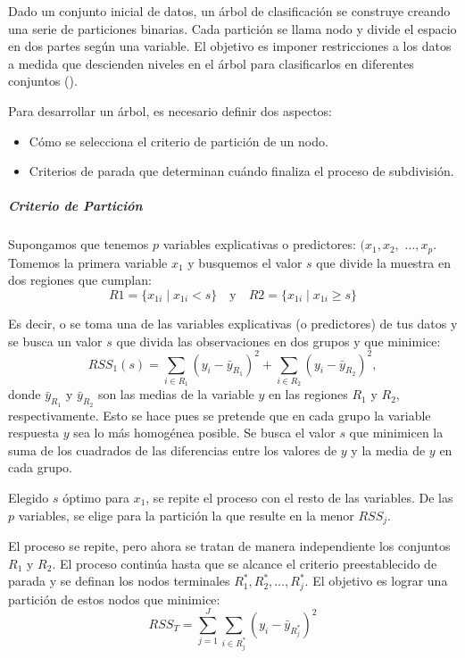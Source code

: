 {Dado un conjunto inicial de datos, un árbol de clasificación se construye creando una serie de particiones binarias. Cada partición se llama nodo y divide el espacio en dos partes según una variable. El objetivo es imponer restricciones a los datos a medida que descienden niveles en el árbol para clasificarlos en diferentes conjuntos (\cite{wu2008top}).

Para desarrollar un árbol, es necesario definir dos aspectos:
\begin{itemize}
	\item Cómo se selecciona el criterio de partición de un nodo.
	\item Criterios de parada que determinan cuándo finaliza el proceso de subdivisión.
\end{itemize}


\subparagraph{Criterio de Partición}
Supongamos que tenemos \(p\) variables explicativas o predictores: $(x_1, x_2,$ $\ldots, x_p$. Tomemos la primera variable \(x_1\) y busquemos el valor \(s\) que divide la muestra en dos regiones que cumplan:
\[
R1 = \{x_{1i} \mid x_{1i} < s\} \quad \text{y} \quad R2 = \{x_{1i} \mid x_{1i} \geq s\}
\]

Es decir, o se toma una de las variables explicativas (o predictores) de tus datos y se busca un valor $s$ que divida las observaciones en dos grupos y que minimice:
\[
RSS_1(s) = \sum_{i \in R_1} (y_i - \bar{y}_{R_1})^2 + \sum_{i \in R_2} (y_i - \bar{y}_{R_2})^2,
\]
donde \(\bar{y}_{R_1}\) y \(\bar{y}_{R_2}\) son las medias de la variable \(y\) en las regiones \(R_1\) y \(R_2\), respectivamente. Esto se hace pues se pretende que en cada grupo la variable respuesta \(y\) sea lo más homogénea posible. Se busca el valor $s$ que minimicen la suma de los cuadrados de las diferencias entre los valores de $y$ y la media de $y$ en cada grupo.

Elegido \(s\) óptimo para \(x_1\), se repite el proceso con el resto de las variables. De las \(p\) variables, se elige para la partición la que resulte en la menor \(RSS_j\).

El proceso se repite, pero ahora se tratan de manera independiente los conjuntos \(R_1\) y \(R_2\). El proceso continúa hasta que se alcance el criterio preestablecido de parada y se definan los nodos terminales \(R_1^*, R_2^*, \ldots, R_j^*\). El objetivo es lograr una partición de estos nodos que minimice:
\[
RSS_T = \sum_{j=1}^{J} \sum_{i \in R_j^*} (y_i - \bar{y}_{R_j^*})^2
\]

}
